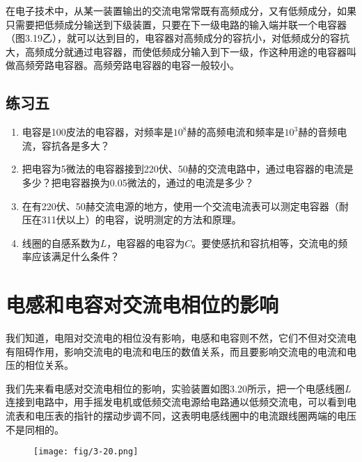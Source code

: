 在电子技术中，从某一装置输出的交流电常常既有高频成分，又有低频成分，如果只需要把低频成分输送到下级装置，只要在下一级电路的输入端并联一个电容器（图3.19乙），就可以达到目的，电容器对高频成分的容抗小，对低频成分的容抗大，高频成分就通过电容器，而使低频成分输入到下一级，作这种用途的电容器叫做高频旁路电容器。高频旁路电容器的电容一般较小。

\subsection*{练习五}
\begin{enumerate}
    \item 电容是100皮法的电容器，对频率是$10^8$赫的高频电流和频率是$10^3$赫的音频电流，容抗各是多大？
    \item 把电容为5微法的电容器接到220伏、50赫的交流电路中，通过电容器的电流是多少？把电容器换为0.05微法的，通过的电流是多少？
    \item 在有220伏、50赫交流电源的地方，使用一个交流电流表可以测定电容器（耐压在311伏以上）的电容，说明测定的方法和原理。
    \item 线圈的自感系数为$L$，电容器的电容为$C$。要使感抗和容抗相等，交流电的频率应该满足什么条件？
\end{enumerate}

\section{电感和电容对交流电相位的影响}
我们知道，电阻对交流电的相位没有影响，电感和电容则不然，它们不但对交流电有阻碍作用，影响交流电的电流和电压的数值关系，而且要影响交流电的电流和电压的相位关系。

我们先来看电感对交流电相位的影响，实验装置如图3.20所示，把一个电感线圈$L$连接到电路中，用手摇发电机或低频交流电源给电路通以低频交流电，可以看到电流表和电压表的指针的摆动步调不同，这表明电感线圈中的电流跟线圈两端的电压不是同相的。
\begin{figure}[htp]\centering
    \texttt{[image: fig/3-20.png]}
    \caption{}
    \end{figure}

